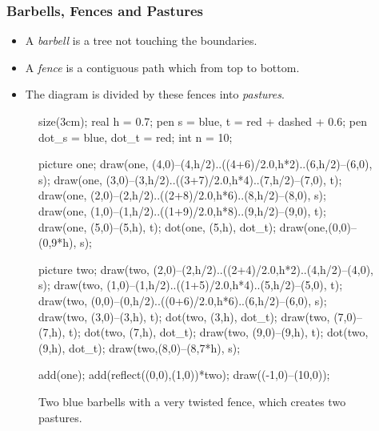 \documentclass[pdf]{beamer}
\def\ii{\item}
\theoremstyle{definition}
\begin{document}
\begin{frame}[fragile]
	\frametitle{Barbells, Fences and Pastures}
	\begin{definition}
		\begin{itemize}
			\ii A \emph{barbell} is a tree not touching the boundaries.
			\ii A \emph{fence} is a contiguous path which from top to bottom.
			\ii The diagram is divided by these fences into \emph{pastures}.
		\end{itemize}
	\end{definition}
	\begin{figure}[ht]
		\centering
		\begin{asy}
			size(3cm);
			real h = 0.7;
			pen s = blue, t = red + dashed + 0.6;
			pen dot_s = blue, dot_t = red;
			int n = 10;

			picture one;
			draw(one, (4,0)--(4,h/2)..((4+6)/2.0,h*2)..(6,h/2)--(6,0), s);
			draw(one, (3,0)--(3,h/2)..((3+7)/2.0,h*4)..(7,h/2)--(7,0), t);
			draw(one, (2,0)--(2,h/2)..((2+8)/2.0,h*6)..(8,h/2)--(8,0), s);
			draw(one, (1,0)--(1,h/2)..((1+9)/2.0,h*8)..(9,h/2)--(9,0), t);
			draw(one, (5,0)--(5,h), t);
			dot(one, (5,h), dot_t);
			draw(one,(0,0)--(0,9*h), s);

			picture two;
			draw(two, (2,0)--(2,h/2)..((2+4)/2.0,h*2)..(4,h/2)--(4,0), s);
			draw(two, (1,0)--(1,h/2)..((1+5)/2.0,h*4)..(5,h/2)--(5,0), t);
			draw(two, (0,0)--(0,h/2)..((0+6)/2.0,h*6)..(6,h/2)--(6,0), s);
			draw(two, (3,0)--(3,h), t);
			dot(two, (3,h), dot_t);
			draw(two, (7,0)--(7,h), t);
			dot(two, (7,h), dot_t);
			draw(two, (9,0)--(9,h), t);
			dot(two, (9,h), dot_t);
			draw(two,(8,0)--(8,7*h), s);

			add(one); add(reflect((0,0),(1,0))*two);
			draw((-1,0)--(10,0));
		\end{asy}
		\caption{Two blue barbells with a very twisted fence, which creates two pastures.}
	\end{figure}
\end{frame}
\end{document}
